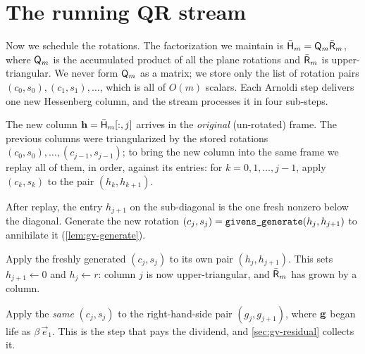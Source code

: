 \section{The running QR stream}
\label{sec:gv-stream}

Now we schedule the rotations. The factorization we maintain is $\bar{\mathsf{H}}_m =
\mathsf{Q}_m \bar{\mathsf{R}}_m$, where $\mathsf{Q}_m$ is the accumulated product of all the plane
rotations and $\bar{\mathsf{R}}_m$ is upper-triangular. We never form $\mathsf{Q}_m$ as a
matrix; we store only the list of rotation pairs $(c_0,s_0),(c_1,s_1),\dots$, which is
all of $O(m)$ scalars. Each Arnoldi step delivers one new Hessenberg column, and the
stream processes it in four sub-steps.

\begin{description}[style=nextline, leftmargin=0pt, font=\normalfont\itshape]
  \item[(i) Replay.] The new column $\mathbf{h} = \bar{\mathsf{H}}_m[:,j]$ arrives in the
  \emph{original} (un-rotated) frame. The previous columns were triangularized by the
  stored rotations $(c_0,s_0),\dots,(c_{j-1},s_{j-1})$; to bring the new column into the
  same frame we replay all of them, in order, against its entries:
  for $k=0,1,\dots,j{-}1$, apply $(c_k,s_k)$ to the pair $(h_k,h_{k+1})$.
  \item[(ii) Generate.] After replay, the entry $h_{j+1}$ on the sub-diagonal is the
  one fresh nonzero below the diagonal. Generate the new rotation $(c_j,s_j) =
  \texttt{givens\_generate}(h_j, h_{j+1})$ to annihilate it (\cref{lem:gv-generate}).
  \item[(iii) Apply to the column.] Apply the freshly generated $(c_j,s_j)$ to its own
  pair $(h_j, h_{j+1})$. This sets $h_{j+1} \gets 0$ and $h_j \gets r$: column $j$ is
  now upper-triangular, and $\bar{\mathsf{R}}_m$ has grown by a column.
  \item[(iv) Apply to the right-hand side.] Apply the \emph{same} $(c_j,s_j)$ to the
  right-hand-side pair $(g_j, g_{j+1})$, where $\mathbf{g}$ began life as $\beta\,\vec e_1$.
  This is the step that pays the dividend, and \cref{sec:gv-residual} collects it.
\end{description}

